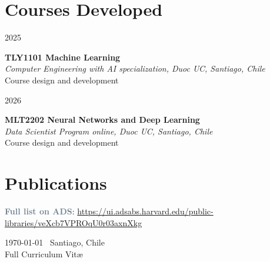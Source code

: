 \documentclass[10pt, a4paper]{article}
\newlength{\datebox}
\newlength{\textbox}
\newcommand{\workitem}[4]{\noindent\parbox[t]{\datebox}{#1}%
    \parbox[t]{\textbox}{\textbf{\textcolor{ViridianGreen}{#2}}\\
    \textit{#3}\\\textcolor{Jet}{\small #4}}\par\vspace{0.4cm}}
\newcommand{\skillitem}[2]{\noindent\textbf{\textcolor{SlateGray}{#1}}: #2\par\vspace{0.2cm}}
\begin{document}
\section*{Courses Developed}
\workitem{2025}{TLY1101 Machine Learning}{Computer Engineering with AI specialization, Duoc UC, Santiago, Chile}{Course design and development}
\workitem{2026}{MLT2202 Neural Networks and Deep Learning}{Data Scientist Program online, Duoc UC, Santiago, Chile}{Course design and development}

\section*{Publications}
\skillitem{Full list on ADS}{\url{https://ui.adsabs.harvard.edu/public-libraries/veXcb7VPROqU0r03axnXkg}}

\nocite{*}
\printbibliography[heading=none]

\vspace{1cm}
\begin{center}
{\small \today\- \-\ Santiago, Chile}\\
{\scriptsize Full Curriculum Vit\ae}
\end{center}
\end{document}
